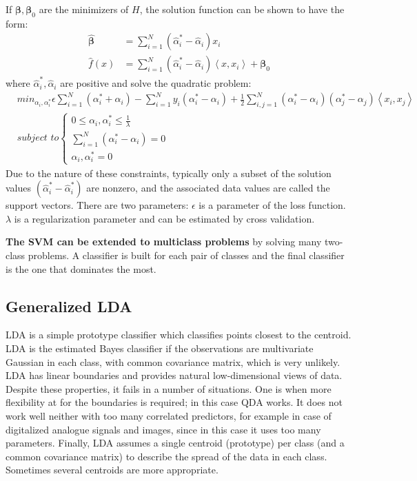 \documentclass[12pt, letterpaper]{article}
\theoremstyle{definition}
\newcommand{\be}{\mathbf{\beta}}
\begin{document}
If $\be, \be_0$ are the minimizers of $H$, the solution function can be shown to have the form:
\begin{equation}
\begin{aligned}
\hat{\be} &= \sum_{i=1}^N(\hat{\alpha}_i^* - \hat{\alpha}_i)x_i\\
\hat{f}(x) &= \sum_{i=1}^N(\hat{\alpha}_i^* - \hat{\alpha}_i)\left\langle x,x_i\right\rangle+\be_0
\end{aligned}
\end{equation}
where $\hat{\alpha}_i^*, \hat{\alpha}_i$ are positive and solve the quadratic problem:
\begin{equation}
\begin{aligned}
&min_{\alpha_i, \alpha_i^*}\epsilon \sum_{i=1}^N(\alpha_i^* + \alpha_i)-\sum_{i=1}^Ny_i(\alpha_i^* - \alpha_i)+\frac{1}{2}\sum_{i,j=1}^N(\alpha_i^* - \alpha_i)(\alpha_j^* - \alpha_j)\left\langle x_i,x_j\right\rangle\\
&\textit{subject to} \left\{ \begin{array}{lll}
		0 \le \alpha_i, \alpha_i^* \le \frac{1}{\lambda}\\
		\sum_{i=1}^N  (\alpha_i^* - \alpha_i) =0\\
		\alpha_i, \alpha_i^* = 0
		\end{array}
		\right.
\end{aligned}
\end{equation}
Due to the nature of these constraints, typically only a subset of the solution values $(\hat{\alpha}_i^* - \hat{\alpha}_i^*)$ are nonzero, and the associated data values are called the support vectors.
There are two parameters: $\epsilon$ is a parameter of the loss function. $\lambda$ is a regularization parameter and can be estimated by cross validation.

\textbf{The SVM can be extended to multiclass problems} by solving many two-class problems. A classifier is built for each pair of classes and the final classifier is the one that dominates the most.

\subsection{Generalized  LDA}
LDA is a simple prototype classifier which classifies points closest to the centroid. LDA is the estimated Bayes classifier if the observations are multivariate Gaussian in each class, with common covariance matrix, which is very unlikely. LDA has linear boundaries and provides natural low-dimensional views of data. Despite these properties, it fails in a number of situations. One is when more flexibility at for the boundaries is required; in this case QDA works. It does not work well neither with too many correlated predictors, for example in case of digitalized analogue signals and images, since in this case it uses too many parameters. Finally, LDA assumes a single centroid (prototype) per class (and a common covariance matrix) to describe the spread of the data in each class. Sometimes  several centroids are more appropriate.
\end{document}
